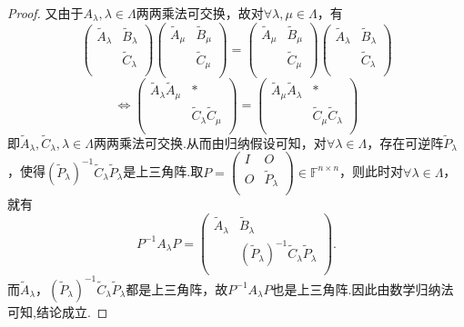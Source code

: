 \documentclass[../../main.tex]{subfiles}
\begin{document}
\begin{proof}
又由于$A_{\lambda},\lambda \in \Lambda$两两乘法可交换，故对$\forall \lambda ,\mu \in \Lambda$，有
\[
\begin{pmatrix}
\widetilde{A}_{\lambda}&		\widetilde{B}_{\lambda}\\
&		\widetilde{C}_{\lambda}\\
\end{pmatrix} \begin{pmatrix}
\widetilde{A}_{\mu}&		\widetilde{B}_{\mu}\\
&		\widetilde{C}_{\mu}\\
\end{pmatrix} =\begin{pmatrix}
\widetilde{A}_{\mu}&		\widetilde{B}_{\mu}\\
&		\widetilde{C}_{\mu}\\
\end{pmatrix} \begin{pmatrix}
\widetilde{A}_{\lambda}&		\widetilde{B}_{\lambda}\\
&		\widetilde{C}_{\lambda}\\
\end{pmatrix} 
\]
\[
\Longleftrightarrow \begin{pmatrix}
\widetilde{A}_{\lambda}\widetilde{A}_{\mu}&		*\\
&		\widetilde{C}_{\lambda}\widetilde{C}_{\mu}\\
\end{pmatrix} =\begin{pmatrix}
\widetilde{A}_{\mu}\widetilde{A}_{\lambda}&		*\\
&		\widetilde{C}_{\mu}\widetilde{C}_{\lambda}\\
\end{pmatrix} 
\]
即$\widetilde{A}_{\lambda},\widetilde{C}_{\lambda},\lambda \in \Lambda$两两乘法可交换.从而由归纳假设可知，对$\forall \lambda \in \Lambda$，存在可逆阵$\widetilde{P}_{\lambda}$，使得$(\widetilde{P}_{\lambda})^{-1}\widetilde{C}_{\lambda}\widetilde{P}_{\lambda}$是上三角阵.取$P=\begin{pmatrix}
I&		O\\
O&		\widetilde{P}_{\lambda}\\
\end{pmatrix} \in \mathbb{F} ^{n\times n}$，则此时对$\forall \lambda \in \Lambda$，就有
\[
P^{-1}A_{\lambda}P=\begin{pmatrix}
\widetilde{A}_{\lambda}&		\widetilde{B}_{\lambda}\\
&		(\widetilde{P}_{\lambda})^{-1}\widetilde{C}_{\lambda}\widetilde{P}_{\lambda}\\
\end{pmatrix}.
\]
而$\widetilde{A}_{\lambda}$，$(\widetilde{P}_{\lambda})^{-1}\widetilde{C}_{\lambda}\widetilde{P}_{\lambda}$都是上三角阵，故$P^{-1}A_{\lambda}P$也是上三角阵.因此由数学归纳法可知,结论成立.

\end{proof}
\end{document}
